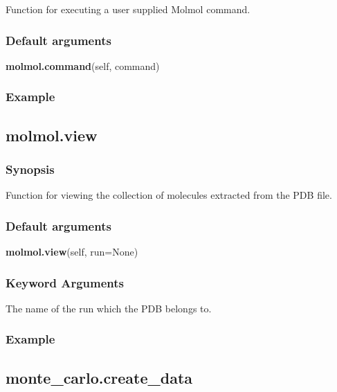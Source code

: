 Function for executing a user supplied Molmol command.

\subsubsection{Default arguments}

\textsf{\textbf{molmol.command}(self, command)}


\subsubsection{Example}




\newpage

\subsection{molmol.view}


\subsubsection{Synopsis}

Function for viewing the collection of molecules extracted from the PDB file.

\subsubsection{Default arguments}

\textsf{\textbf{molmol.view}(self, run=None)}


\subsubsection{Keyword Arguments}

  The name of the run which the PDB belongs to.

\subsubsection{Example}




\newpage

\subsection{monte\_carlo.create\_data}


